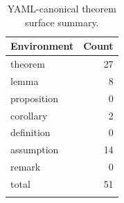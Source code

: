 \begin{table}[htbp]
\centering
\caption{YAML-canonical theorem surface summary.}
\begin{tabular}{lr}
\toprule
Environment & Count \\
\midrule
theorem & 27 \\
lemma & 8 \\
proposition & 0 \\
corollary & 2 \\
definition & 0 \\
assumption & 14 \\
remark & 0 \\
\midrule
total & 51 \\\\
\bottomrule
\end{tabular}
\end{table}
